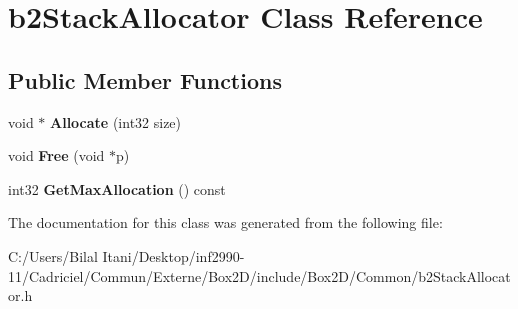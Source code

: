 \hypertarget{classb2_stack_allocator}{}\section{b2\+Stack\+Allocator Class Reference}
\label{classb2_stack_allocator}
\subsection*{Public Member Functions}
\begin{DoxyCompactItemize}
\item 
void $\ast$ {\bfseries Allocate} (int32 size)\hypertarget{classb2_stack_allocator_a3319923944404ab8bad447db0e00d391}{}\label{classb2_stack_allocator_a3319923944404ab8bad447db0e00d391}

\item 
void {\bfseries Free} (void $\ast$p)\hypertarget{classb2_stack_allocator_a3a4384cf5f467828db3022985673db66}{}\label{classb2_stack_allocator_a3a4384cf5f467828db3022985673db66}

\item 
int32 {\bfseries Get\+Max\+Allocation} () const \hypertarget{classb2_stack_allocator_a1530b6889eaa679ab1b0e092e4911366}{}\label{classb2_stack_allocator_a1530b6889eaa679ab1b0e092e4911366}

\end{DoxyCompactItemize}


The documentation for this class was generated from the following file\+:\begin{DoxyCompactItemize}
\item 
C\+:/\+Users/\+Bilal Itani/\+Desktop/inf2990-\/11/\+Cadriciel/\+Commun/\+Externe/\+Box2\+D/include/\+Box2\+D/\+Common/b2\+Stack\+Allocator.\+h\end{DoxyCompactItemize}
